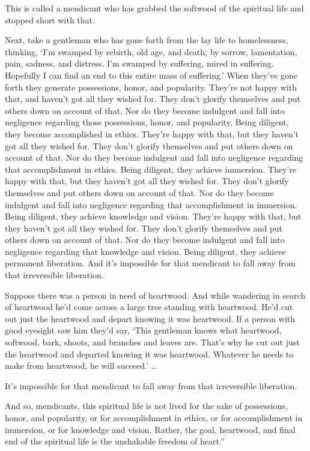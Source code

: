 \documentclass[12pt,openany]{book}%
\begin{document}
This is called a mendicant who has grabbed the softwood of the spiritual life and stopped short with that. 

Next, take a gentleman who has gone forth from the lay life to homelessness, thinking, ‘I’m swamped by rebirth, old age, and death; by sorrow, lamentation, pain, sadness, and distress. I’m swamped by suffering, mired in suffering. Hopefully I can find an end to this entire mass of suffering.’ When they’ve gone forth they generate possessions, honor, and popularity. They’re not happy with that, and haven’t got all they wished for. They don’t glorify themselves and put others down on account of that. Nor do they become indulgent and fall into negligence regarding those possessions, honor, and popularity. Being diligent, they become accomplished in ethics. They’re happy with that, but they haven’t got all they wished for. They don’t glorify themselves and put others down on account of that. Nor do they become indulgent and fall into negligence regarding that accomplishment in ethics. Being diligent, they achieve immersion. They’re happy with that, but they haven’t got all they wished for. They don’t glorify themselves and put others down on account of that. Nor do they become indulgent and fall into negligence regarding that accomplishment in immersion. Being diligent, they achieve knowledge and vision. They’re happy with that, but they haven’t got all they wished for. They don’t glorify themselves and put others down on account of that. Nor do they become indulgent and fall into negligence regarding that knowledge and vision. Being diligent, they achieve permanent liberation. And it’s impossible for that mendicant to fall away from that irreversible liberation. 

Suppose there was a person in need of heartwood. And while wandering in search of heartwood he’d come across a large tree standing with heartwood. He’d cut out just the heartwood and depart knowing it was heartwood. If a person with good eyesight saw him they’d say, ‘This gentleman knows what heartwood, softwood, bark, shoots, and branches and leaves are. That’s why he cut out just the heartwood and departed knowing it was heartwood. Whatever he needs to make from heartwood, he will succeed.’ … 

It’s impossible for that mendicant to fall away from that irreversible liberation. 

And so, mendicants, this spiritual life is not lived for the sake of possessions, honor, and popularity, or for accomplishment in ethics, or for accomplishment in immersion, or for knowledge and vision. Rather, the goal, heartwood, and final end of the spiritual life is the unshakable freedom of heart.” 
\end{document}
